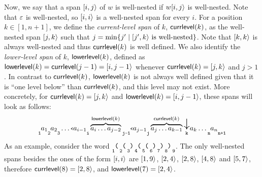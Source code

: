 Now, we say that a span $[i,j\rangle$ of $w$ is well-nested if $w[i,j\rangle$ is well-nested. Note that $\varepsilon$ is well-nested, so $[i,i\rangle$ is a well-nested span for every $i$. 
For a position $k\in[1,n+1]$, we define the {\em current-level span} of $k$, ${\sf currlevel}(k)$, as the well-nested span $[j,k\rangle$ such that $j = \min\{j' \mid [j',k\rangle \text{ is well-nested}\}$. Note that $[k,k\rangle$ is always well-nested and thus ${\sf currlevel}(k)$ is well defined. 
We also identify the {\em lower-level span} of $k$, ${\sf lowerlevel}(k)$, defined as ${\sf lowerlevel}(k) = {\sf currlevel}(j-1) = [i,j-1\rangle$ whenever ${\sf currlevel}(k) = [j,k\rangle$ and $j > 1$. 
In contrast to ${\sf currlevel}(k)$, ${\sf lowerlevel}(k)$ is not always well defined given that it is ``one level below'' than ${\sf currlevel}(k)$, and this level may not exist. More concretely, for ${\sf currlevel}(k) = [j,k\rangle$ and  ${\sf lowerlevel}(k) = [i,j-1\rangle$, 
\noindent these spans will look as follows:
$$
\underset{\tiny\texttt 1}{} a_1 
\underset{\tiny\texttt 2}{} a_2 
\underset{\tiny\texttt 3}{} \ldots 
\op{a}_{i-1} \underset{\tiny\texttt{i}}{}  
\overbrace{a_{i} \ldots a_{j-2}}^{\llevel(k)} 
\underset{\tiny\texttt{j-1}}{} \op{a}_{j-1} 
\underset{\tiny\texttt{j}}{} 
\overbrace{a_{j} \ldots  a_{k-1}}^{\clevel(k)} 
\overset{\text{\LARGE $\downarrow$}}{\underset{\tiny\texttt{k}}{}} a_{k} \ldots
\underset{\tiny\texttt n}{} a_n \underset{\tiny\texttt{n+1}}{}
$$
As an example, consider the word $ 
\underset{\tiny\texttt 1}{} {\texttt (} \, 
\underset{\tiny\texttt 2}{} {\texttt (} \, 
\underset{\tiny\texttt 3}{} {\texttt )} \, 
\underset{\tiny\texttt 4}{} {\texttt (} \, 
\underset{\tiny\texttt 5}{} {\texttt (} \, 
\underset{\tiny\texttt 6}{} {\texttt )} \, 
\underset{\tiny\texttt 7}{} {\texttt )} \, 
\underset{\tiny\texttt 8}{} {\texttt )} \,
\underset{\tiny\texttt 9}{}$. 
The only well-nested spans besides the ones of the form $[i,i\rangle$ are $[1,9\rangle$, $[2,4\rangle$, $[2,8\rangle$, $[4,8\rangle$ and $[5,7\rangle$, therefore ${\sf currlevel}(8) = [2,8\rangle$, and ${\sf lowerlevel}(7) = [2,4\rangle$.

